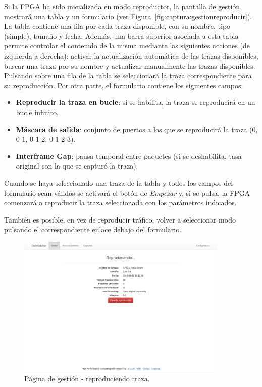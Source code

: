 Si la \gls{FPGA} ha sido inicializada en modo reproductor, la pantalla de gestión mostrará una tabla y un formulario (ver Figura~\ref{fig:captura:gestionreproducir}).
La tabla contiene una fila por cada \gls{traza} disponible, con su nombre, tipo (\gls{simple}), tamaño y fecha.
Además, una barra superior asociada a esta tabla permite controlar el contenido de la misma mediante las siguientes acciones (de izquierda a derecha): activar la actualización automática de las \glspl{traza} disponibles, buscar una \gls{traza} por su nombre y actualizar manualmente las \glspl{traza} disponibles.
Pulsando sobre una fila de la tabla se seleccionará la \gls{traza} correspondiente para su reproducción.
Por otra parte, el formulario contiene los siguientes campos:
\begin{itemize}
  \item \textbf{Reproducir la \gls{traza} en bucle}: si se habilita, la \gls{traza} se reproducirá en un bucle infinito.
  \item \textbf{Máscara de salida}: conjunto de puertos a los que se reproducirá la \gls{traza} (0, 0-1, 0-1-2, 0-1-2-3).
  \item \textbf{Interframe Gap}: pausa temporal entre paquetes (si se deshabilita, tasa original con la que se capturó la \gls{traza}).
\end{itemize}

Cuando se haya seleccionado una traza de la tabla y todos los campos del formulario sean válidos se activará el botón de \textit{Empezar} y, si se pulsa, la \gls{FPGA} comenzará a reproducir la \gls{traza} seleccionada con los parámetros indicados.

También es posible, en vez de reproducir tráfico, volver a seleccionar modo pulsando el correspondiente enlace debajo del formulario.

\begin{figure}[!htp]
  \centering
  \includegraphics[width=0.9\textwidth,clip=true]{graphics/capturas/gestor_reproduccion}
  \caption{Página de gestión - reproduciendo \gls{traza}.}
  \label{fig:captura:gestionreproduciendo}
\end{figure}

